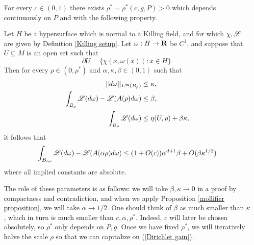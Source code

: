 \begin{lemma}\label{Dirichlet}
For every $c \in (0, 1)$ there exists $\rho^* = \rho^*(c, g, P) > 0$ which depends continuously on $P$ and with the following property.

Let $H$ be a hypersurface which is normal to a Killing field, and for which $\chi,\mathscr L$ are given by Definition \ref{Killing setup}.
Let $\omega: H \to \mathbf{R}$ be $C^1$, and suppose that $U \subseteq M$ is an open set such that
$$\partial U = \{\chi(x, \omega(x)): x \in H\}.$$
Then for every $\rho \in (0, \rho^*)$ and $\alpha, \kappa, \beta \in (0, 1)$ such that
\begin{align}
||d\omega||_{L^\infty(B_\rho)} &\leq \kappa, \label{Dirichlet small derivative}\\
\int_{B_\rho} \mathscr L(d\omega) - \mathscr L(A(\rho)d\omega) &\leq \beta, \label{Dirichlet close to mean} \\
\int_{B_\rho} \mathscr L(d\omega) &\leq \eta(U, \rho) + \beta \kappa, \label{Dirichlet close to minimal}
\end{align}
it follows that
\begin{equation}\label{Dirichlet gain}
\int_{B_{\alpha\rho}} \mathscr L(d\omega) - \mathscr L(A(\alpha\rho)d\omega) \leq (1 + O(c))\alpha^{d + 1}\beta + O(\beta \kappa^{1/2})
\end{equation}
where all implied constants are absolute.
\end{lemma}
The role of these parameters is as follows: we will take $\beta,\kappa \to 0$ in a proof by compactness and contradiction, and when we apply Proposition \ref{mollifier proposition}, we will take $\alpha \to 1/2$. One should think of $\beta$ as much smaller than $\kappa$, which in turn is much smaller than $c,\alpha,\rho^*$.
Indeed, $c$ will later be chosen absolutely, so $\rho^*$ only depends on $P,g$.
Once we have fixed $\rho^*$, we will iteratively halve the scale $\rho$ so that we can capitalize on (\ref{Dirichlet gain}).
